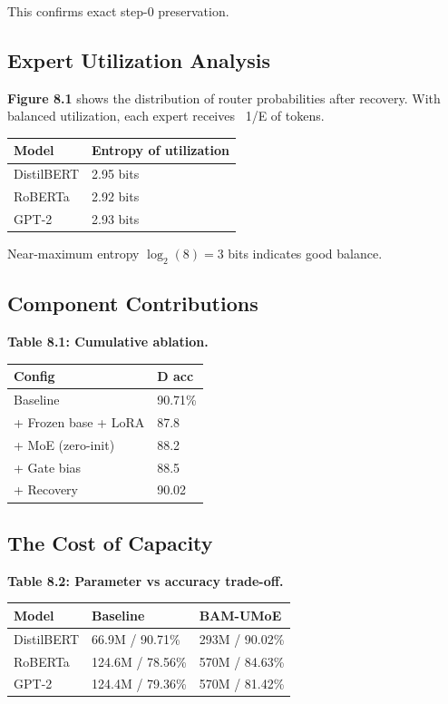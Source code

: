This confirms exact step-0 preservation.

\subsection{Expert Utilization Analysis}

\textbf{Figure 8.1} shows the distribution of router probabilities after recovery. 
With balanced utilization, each expert receives ~1/E of tokens.

\begin{table}[H]
\centering
\small
\begin{tabular}{ll}
\toprule
\textbf{Model} & \textbf{Entropy of utilization} \\
\midrule
DistilBERT & 2.95 bits \\
RoBERTa & 2.92 bits \\
GPT-2 & 2.93 bits \\
\bottomrule
\end{tabular}
\end{table}

Near-maximum entropy $\log_2(8) = 3$ bits indicates good balance.

\subsection{Component Contributions}

\textbf{Table 8.1: Cumulative ablation.}

\begin{table}[H]
\centering
\small
\begin{tabular}{ll}
\toprule
\textbf{Config} & \textbf{D acc} \\
\midrule
Baseline & 90.71\% \\
+ Frozen base + LoRA & 87.8 \\
+ MoE (zero-init) & 88.2 \\
+ Gate bias & 88.5 \\
+ Recovery & 90.02 \\
\bottomrule
\end{tabular}
\end{table}

\subsection{The Cost of Capacity}

\textbf{Table 8.2: Parameter vs accuracy trade-off.}

\begin{table}[H]
\centering
\small
\begin{tabular}{lll}
\toprule
\textbf{Model} & \textbf{Baseline} & \textbf{BAM-UMoE} \\
\midrule
DistilBERT & 66.9M / 90.71\% & 293M / 90.02\% \\
RoBERTa & 124.6M / 78.56\% & 570M / 84.63\% \\
GPT-2 & 124.4M / 79.36\% & 570M / 81.42\% \\
\bottomrule
\end{tabular}
\end{table}

